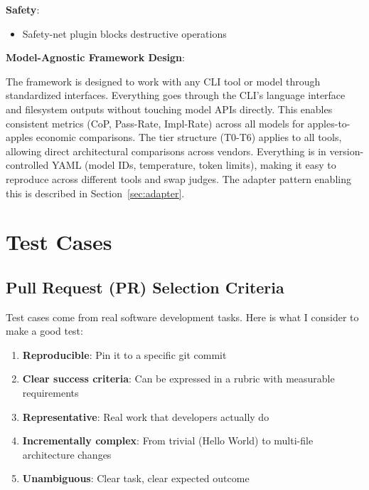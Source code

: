 \documentclass[11pt]{article}
\begin{document}
\textbf{Safety}:

\begin{itemize}
\item Safety-net plugin blocks destructive operations
\end{itemize}

\textbf{Model-Agnostic Framework Design}:

The framework is designed to work with any CLI tool or model through standardized
interfaces. Everything goes through the CLI's language interface and filesystem
outputs without touching model APIs directly. This enables consistent metrics
(CoP, Pass-Rate, Impl-Rate) across all models for apples-to-apples economic
comparisons. The tier structure (T0-T6) applies to all tools, allowing direct
architectural comparisons across vendors. Everything is in version-controlled
YAML (model IDs, temperature, token limits), making it easy to reproduce across
different tools and swap judges. The adapter pattern enabling this is described in Section~\ref{sec:adapter}.

\section{Test Cases}

\subsection{Pull Request (PR) Selection Criteria}

Test cases come from real software development tasks. Here is what I consider to
make a good test:

\begin{enumerate}
\item \textbf{Reproducible}: Pin it to a specific git commit
\item \textbf{Clear success criteria}: Can be expressed in a rubric with measurable requirements
\item \textbf{Representative}: Real work that developers actually do
\item \textbf{Incrementally complex}: From trivial (Hello World) to multi-file architecture changes
\item \textbf{Unambiguous}: Clear task, clear expected outcome
\end{enumerate}
\end{document}
